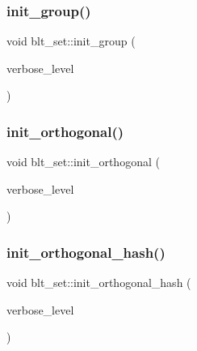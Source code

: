 \mbox{\label{classblt__set_a9e5aede3bbac6f5e1dd31a8965bba200}} 
\subsubsection{\texorpdfstring{init\+\_\+group()}{init\_group()}}
{\footnotesize\ttfamily void blt\+\_\+set\+::init\+\_\+group (\begin{DoxyParamCaption}\item[{\mbox{\hyperlink{galois_8h_a09fddde158a3a20bd2dcadb609de11dc}{I\+NT}}}]{verbose\+\_\+level }\end{DoxyParamCaption})}

\mbox{\label{classblt__set_a030c4f21140e07855f55f68c7586b4ce}} 
\subsubsection{\texorpdfstring{init\+\_\+orthogonal()}{init\_orthogonal()}}
{\footnotesize\ttfamily void blt\+\_\+set\+::init\+\_\+orthogonal (\begin{DoxyParamCaption}\item[{\mbox{\hyperlink{galois_8h_a09fddde158a3a20bd2dcadb609de11dc}{I\+NT}}}]{verbose\+\_\+level }\end{DoxyParamCaption})}

\mbox{\label{classblt__set_ad8a73370e16f2adf30172c3159ca8a74}} 
\subsubsection{\texorpdfstring{init\+\_\+orthogonal\+\_\+hash()}{init\_orthogonal\_hash()}}
{\footnotesize\ttfamily void blt\+\_\+set\+::init\+\_\+orthogonal\+\_\+hash (\begin{DoxyParamCaption}\item[{\mbox{\hyperlink{galois_8h_a09fddde158a3a20bd2dcadb609de11dc}{I\+NT}}}]{verbose\+\_\+level }\end{DoxyParamCaption})}

